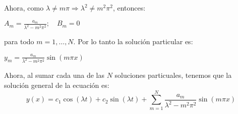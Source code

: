 Ahora, como $\lambda \neq m \pi \Rightarrow \lambda^{2} \neq m^{2} \pi^{2}$, entonces:

\begin{center}

$A_{m}=\frac{a_{m}}{\lambda^{2}-m^{2} \pi^{2}} ; \quad B_{m}=0$

\end{center}

para todo $m=1, \ldots, N$. Por lo tanto la solución particular es:\\

\begin{center}

$y_{m}=\frac{a_{m}}{\lambda^{2}-m^{2} \pi^{2}} \sin (m \pi x)$

\end{center}

Ahora, al sumar cada una de las $N$ soluciones particuales, tenemos que la solución general de la ecuación es:\\
$$
y(x)=c_{1} \cos (\lambda t)+c_{2} \sin (\lambda t)+\sum_{m=1}^{N} \frac{a_{m}}{\lambda^{2}-m^{2} \pi^{2}} \sin (m \pi x)
$$
